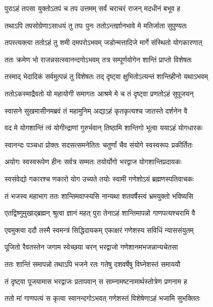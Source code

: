 \twolineshloka
{पुराऽहं तपसा युक्तोऽतपं च तप उत्तमम्}
{सर्वं चराचरं राजन् मदधीनं बभूव ह} %

\twolineshloka
{तथाऽपि तपसोग्रेणाऽसाधयं तु तपः पुनः}
{ततोऽन्तर्ज्ञानभावे मे मतिर्जाता सुपुण्यतः} %

\twolineshloka
{तपस्त्यक्त्वा ततोऽहं तु शमी दमपरोऽभवम्}
{जडोन्मत्तादिजे मार्गे संस्थितो योगकारणात्} %

\twolineshloka
{ततः क्रमेण भो राजन्नसत्स्वानन्दगोऽभवम्}
{तत्र सम्पूर्णयोगेन शान्तिं प्राप्तो विशेषतः} %

\twolineshloka
{तस्माद् भेदादिकं सर्वमुत्पन्नं तु विशेषतः}
{तद् दृष्ट्वा क्षुभितोऽत्यन्तं शान्तिहीनो यथाऽभवम्} %

\twolineshloka
{ततोऽकस्माद्रैवतो यो महायोगी समागतः}
{आश्रमे मे च तं दृष्ट्वा प्रणतोऽहं सुपूजयन्} %

\twolineshloka
{स्वासने सुखमासीनमब्रवं तं महामुनिम्}
{अद्याऽहं कृतकृत्यश्च जातस्ते दर्शनेन वै} %

\twolineshloka
{वद मे योगशान्तिं त्वं योगीन्द्राणां गुरुर्भवान्}
{तिष्ठामि शान्तिगो भूत्वा ययाऽहं योगधारकः} %


\twolineshloka
{स्वानन्दः पञ्चधा प्रोक्तः सदसत्समनेतितः}
{चतुर्णां चैव संयोगे स्वस्वरूपः प्रकीर्तितः} %

\twolineshloka
{अयोगः स्वस्वरूपेण हीनः सर्वत्र सम्मतः}
{तयोर्योगो भरद्वाज योगशान्तिप्रदायकः} %

\twolineshloka
{स्वसंवेद्यो गकारश्च णकारो योग उच्यते}
{तयोः स्वामी गणेशोऽयं ब्रह्मणस्पतिवाचकः} %

\twolineshloka
{तं भजस्व महाभाग ततः शान्तिमवाप्स्यसि}
{नान्यथा शतवर्षैस्त्वं भ्रमयुक्तो भविष्यसि} %

\twolineshloka
{एतद्विष्णुमुखाद्ब्रह्मन् श्रुत्वा ज्ञानं महत् पुरा}
{तेनाऽहं शान्तिमापन्नो गाणपत्यश्चरामि वै} %

\twolineshloka
{एवमुक्त्वा ददौ तस्मै स्वमन्त्रं सिद्धिदायकम्}
{एकाक्षरं गणेशस्य सविधिं न्याससंयुतम्} %

\twolineshloka
{पूजितो रैवतस्तेन जगाम स्वेच्छया चरन्}
{भरद्वाजो गणेशानमभजन्नान्यचेतसा} %

\twolineshloka
{ततः शान्तिं समापन्नो तथाऽपि भजने रतः}
{गतेषु दशवर्षेषु विघ्नेशस्तं समाययौ} %

\twolineshloka
{तं दृष्ट्वा पूजयामास भरद्वाजः प्रतापवान्}
{स साम्नामष्टनामार्थस्तोत्रेण प्रणनाम ह} %

\twolineshloka
{ततो मां गाणपत्यं स कृत्वा स्वानन्दगोऽभवत्}
{गणेशस्तं विशेषेणाऽहं भजामि सुभक्तितः} %

